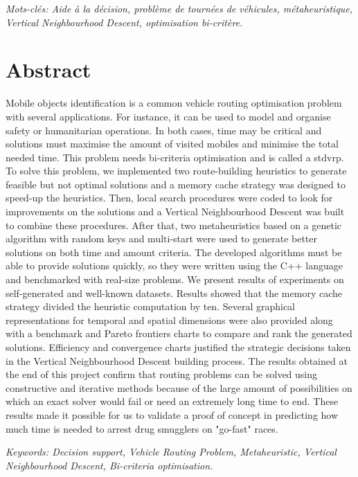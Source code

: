 \emph{Mots-clés: Aide à la décision, problème de tournées de véhicules, métaheuristique, Vertical Neighbourhood Descent, optimisation bi-critère.}

\newpage
\section*{Abstract}

Mobile objects identification is a common vehicle routing optimisation problem with several applications. For instance, it can be used to model and organise safety or humanitarian operations. In both cases, time may be critical and solutions must maximise the amount of visited mobiles and minimise the total needed time. This problem needs bi-criteria optimisation and is called a \acrlong{stdvrp}. To solve this problem, we implemented two route-building heuristics to generate feasible but not optimal solutions and a memory cache strategy was designed to speed-up the heuristics. Then, local search procedures were coded to look for improvements on the solutions and a Vertical Neighbourhood Descent was built to combine these procedures. After that, two metaheuristics based on a genetic algorithm with random keys and multi-start were used to generate better solutions on both time and amount criteria. The developed algorithms must be able to provide solutions quickly, so they were written using the C++ language and benchmarked with real-size problems. We present results of experiments on self-generated and well-known datasets. Results showed that the memory cache strategy divided the heuristic computation by ten. Several graphical representations for temporal and spatial dimensions were also provided along with a benchmark and Pareto frontiers charts to compare and rank the generated solutions. Efficiency and convergence charts justified the strategic decisions taken in the Vertical Neighbourhood Descent building process. The results obtained at the end of this project confirm that routing problems can be solved using constructive and iterative methods because of the large amount of possibilities on which an exact solver would fail or need an extremely long time to end. These results made it possible for us to validate a proof of concept in predicting how much time is needed to arrest drug smugglers on "go-fast" races.

\emph{Keywords: Decision support, Vehicle Routing Problem, Metaheuristic, Vertical Neighbourhood Descent, Bi-criteria optimisation.}
